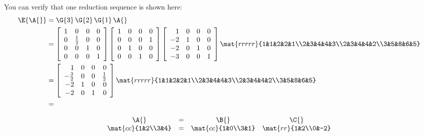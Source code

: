 You can verify that one reduction sequence is shown here:
\begin{equation}
\begin{split}
  \E{\A{}} &= \G{3}\,\G{2}\,\G{1}\,\A{}\\
 & =
\left[
\begin{array}{cccc}
 1 & 0 & 0 & 0 \\
 0 & \frac{1}{2} & 0 & 0 \\
 0 & 0 & 1 & 0 \\
 0 & 0 & 0 & 1
\end{array}
\right]
\left[
\begin{array}{cccc}
 1 & 0 & 0 & 0 \\
 0 & 0 & 0 & 1 \\
 0 & 1 & 0 & 0 \\
 0 & 0 & 1 & 0
\end{array}
\right]
\left[
\begin{array}{rccc}
 1 & 0 & 0 & 0 \\
 -2 & 1 & 0 & 0 \\
 -2 & 0 & 1 & 0 \\
 -3 & 0 & 0 & 1
\end{array}
\right]
\mat{rrrrr}{1&1&2&2&1\\2&3&4&4&3\\2&3&4&4&2\\3&5&8&6&5}\\
   &= 
\left[
\begin{array}{rrrr}
 1 & 0 & 0 & 0 \\
 -\frac{3}{2} & 0 & 0 & \frac{1}{2} \\
 -2 & 1 & 0 & 0 \\
 -2 & 0 & 1 & 0
\end{array}
\right]
\mat{rrrrr}{1&1&2&2&1\\2&3&4&4&3\\2&3&4&4&2\\3&5&8&6&5}\\
  &=
  
\end{split}
\end{equation}

\begin{equation}
  \begin{array}{cccc}
    \A{}&=&\B{}&\C{}\\
    \mat{cc}{1&2\\3&4} &=& \mat{cc}{1&0\\3&1}&\mat{rr}{1&2\\0&-2}
  \end{array}
\end{equation}

